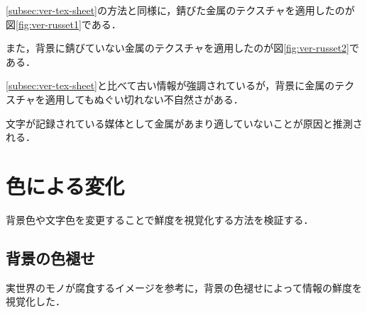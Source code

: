 \ref{subsec:ver-tex-sheet}の方法と同様に，錆びた金属のテクスチャを適用したのが図\ref{fig:ver-russet1}である．

また，背景に錆びていない金属のテクスチャを適用したのが図\ref{fig:ver-russet2}である．

\ref{subsec:ver-tex-sheet}と比べて古い情報が強調されているが，背景に金属のテクスチャを適用してもぬぐい切れない不自然さがある．

文字が記録されている媒体として金属があまり適していないことが原因と推測される．

\section{色による変化}
\label{sec:ver-color}

背景色や文字色を変更することで鮮度を視覚化する方法を検証する．

\subsection{背景の色褪せ}
\label{subsec:ver-col-cor}

実世界のモノが腐食するイメージを参考に，背景の色褪せによって情報の鮮度を視覚化した．

